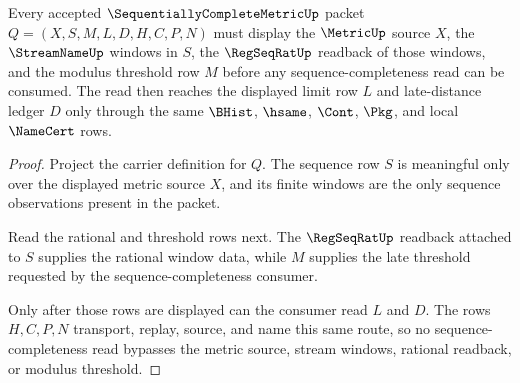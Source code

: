 \begin{theorem}
\label{thm:sequentially-complete-metric-cauchy-sequence-obligation}
Every accepted $\SequentiallyCompleteMetricUp$ packet $Q=(X,S,M,L,D,H,C,P,N)$ must display the $\MetricUp$ source $X$, the $\StreamNameUp$ windows in $S$, the $\RegSeqRatUp$ readback of those windows, and the modulus threshold row $M$ before any sequence-completeness read can be consumed. The read then reaches the displayed limit row $L$ and late-distance ledger $D$ only through the same $\BHist$, $\hsame$, $\Cont$, $\Pkg$, and local $\NameCert$ rows.
\end{theorem}
\begin{proof}
Project the carrier definition for $Q$. The sequence row $S$ is meaningful only over the displayed metric source $X$, and its finite windows are the only sequence observations present in the packet.

Read the rational and threshold rows next. The $\RegSeqRatUp$ readback attached to $S$ supplies the rational window data, while $M$ supplies the late threshold requested by the sequence-completeness consumer.

Only after those rows are displayed can the consumer read $L$ and $D$. The rows $H,C,P,N$ transport, replay, source, and name this same route, so no sequence-completeness read bypasses the metric source, stream windows, rational readback, or modulus threshold.
\end{proof}

